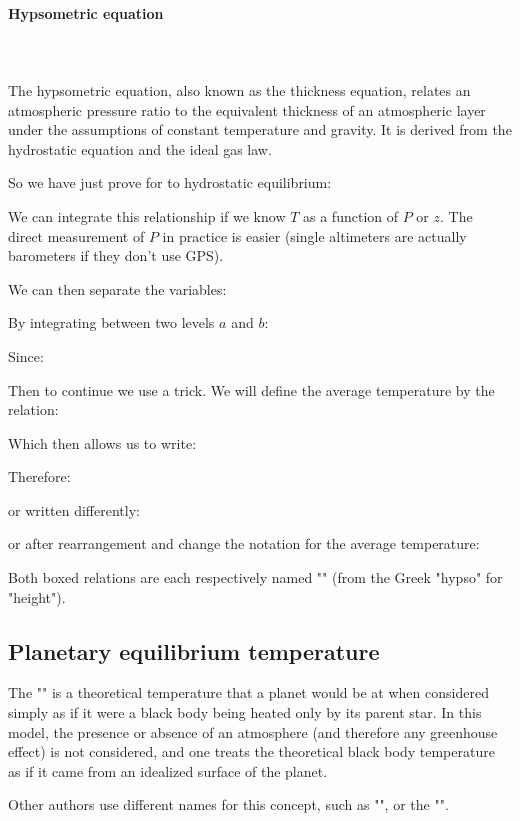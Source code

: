 	\pagebreak
	\paragraph{Hypsometric equation}\mbox{}\\\\
	The hypsometric equation, also known as the thickness equation, relates an atmospheric pressure ratio to the equivalent thickness of an atmospheric layer under the assumptions of constant temperature and gravity. It is derived from the hydrostatic equation and the ideal gas law.
	
	So we have just prove for to hydrostatic equilibrium:
	
	
	We can integrate this relationship if we know $T$ as a function of $P$ or $z$. The direct measurement of $P$ in practice is easier (single altimeters are actually barometers if they don't use GPS).

	We can then separate the variables:
	
	By integrating between two levels $a$ and $b$:
	
	Since:
	
	Then to continue we use a trick. We will define the average temperature by the relation:
	
	Which then allows us to write:
	
	Therefore:
	
	or written differently:
	
	or after rearrangement and change the notation for the average temperature:
	
	Both boxed relations are each respectively named "" (from the Greek "hypso" for "height").
	
	\pagebreak
	\subsection{Planetary equilibrium temperature}
	The "" is a theoretical temperature that a planet would be at when considered simply as if it were a black body being heated only by its parent star. In this model, the presence or absence of an atmosphere (and therefore any greenhouse effect) is not considered, and one treats the theoretical black body temperature as if it came from an idealized surface of the planet.

	Other authors use different names for this concept, such as "", or the "".

